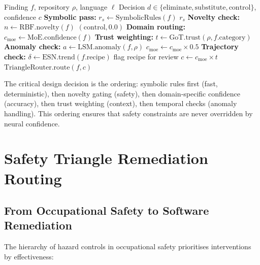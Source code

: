 \documentclass[11pt,a4paper]{article}
\begin{document}
\begin{algorithm}[htbp]
\caption{Neurosymbolic Decision Fusion}
\label{alg:fusion}
\begin{algorithmic}[1]
\Require Finding $f$, repository $\rho$, language $\ell$
\Ensure Decision $d \in \{\text{eliminate}, \text{substitute}, \text{control}\}$, confidence $c$
\State \textbf{Symbolic pass:} $r_s \gets \text{SymbolicRules}(f)$
 \Return $r_s$ \EndIf
\State \textbf{Novelty check:} $n \gets \text{RBF}.\text{novelty}(f)$
 \Return $(\text{control}, 0.0)$  \EndIf
\State \textbf{Domain routing:} $c_{\text{moe}} \gets \text{MoE}.\text{confidence}(f)$
\State \textbf{Trust weighting:} $t \gets \text{GoT}.\text{trust}(\rho, f.\text{category})$
\State \textbf{Anomaly check:} $a \gets \text{LSM}.\text{anomaly}(f, \rho)$
 $c_{\text{moe}} \gets c_{\text{moe}} \times 0.5$  \EndIf
\State \textbf{Trajectory check:} $\delta \gets \text{ESN}.\text{trend}(f.\text{recipe})$
 flag recipe for review \EndIf
\State $c \gets c_{\text{moe}} \times t$ 
\State \Return $\text{TriangleRouter}.\text{route}(f, c)$
\end{algorithmic}
\end{algorithm}

The critical design decision is the ordering: symbolic rules first (fast, deterministic), then novelty gating (safety), then domain-specific confidence (accuracy), then trust weighting (context), then temporal checks (anomaly handling). This ordering ensures that safety constraints are never overridden by neural confidence.


\section{Safety Triangle Remediation Routing}
\label{sec:triangle}

\subsection{From Occupational Safety to Software Remediation}

The hierarchy of hazard controls in occupational safety \citep{niosh2015} prioritises interventions by effectiveness:
\end{document}
